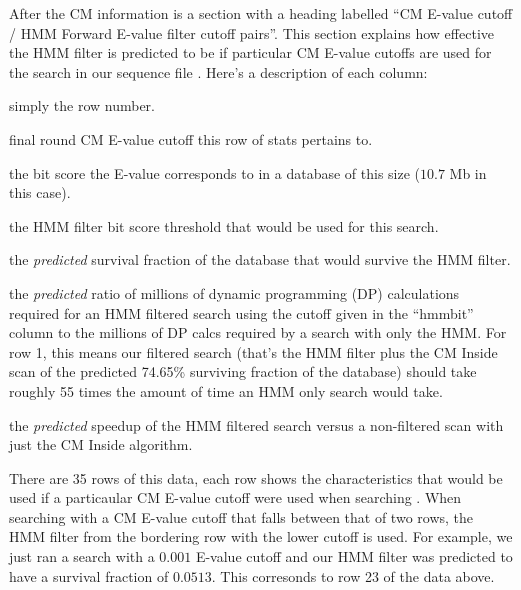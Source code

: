 After the CM information is a section with a heading labelled ``CM 
E-value cutoff / HMM Forward E-value filter cutoff pairs''. This
section explains how effective the HMM filter is predicted to be if
particular CM E-value cutoffs are used for the search in our sequence file
. Here's a description of each column:
\begin{wideitem}

\item[\emprog{idx}] simply the row number.

\item[\emprog{cm E}] final round CM E-value cutoff this row of stats pertains
  to.

\item[\emprog{cm bit}] the bit score the E-value corresponds to in a
  database of this size ($10.7$ Mb in this case).

\item[\emprog{hmm bit}] the HMM filter bit score threshold that would
  be used for this search.

\item[\emprog{surv}] the \textit{predicted} survival fraction of the database
  that would survive the HMM filter.

\item[\emprog{xhmm}] the \emph{predicted} ratio of millions of dynamic programming (DP)
  calculations required for an HMM filtered search using the cutoff
  given in the ``hmmbit'' column to the millions of DP calcs required
  by a search with only the HMM. For row 1, this means our filtered search
  (that's the HMM filter plus the CM Inside scan of the predicted
  74.65\% surviving fraction of the database) should take
  roughly 55 times the amount of time an HMM only search would take.
  
\item[\emprog{speedup}] the \textit{predicted} speedup of the HMM filtered
  search versus a non-filtered scan with just the CM Inside algorithm.

\end{wideitem}

There are 35 rows of this data, each row shows the characteristics
that would be used if a particaular CM E-value cutoff were used when
searching . When searching with a
CM E-value cutoff that falls between that of two rows, the HMM filter
from the bordering row with the lower cutoff is used. For example, we
just ran a search with a $0.001$ E-value cutoff and our HMM filter was
predicted to have a survival fraction of $0.0513$. This corresonds to
row 23 of the data above. 

